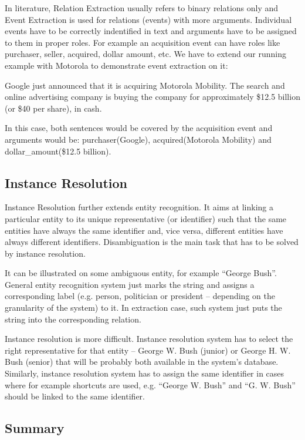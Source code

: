In literature, Relation Extraction usually refers to binary relations only and Event Extraction is used for relations (events) with more arguments. Individual events have to be correctly indentified in text and arguments have to be assigned to them in proper roles. For example an acquisition event can have roles like purchaser, seller, acquired, dollar amount, etc. We have to extend our running example with Motorola to demonstrate event extraction on it:

Google just announced that it is acquiring Motorola Mobility. The search and online advertising company is buying the company for approximately \$12.5 billion (or \$40 per share), in cash.

In this case, both sentences would be covered by the acquisition event and arguments would be: purchaser(Google), acquired(Motorola Mobility) and dollar\_amount(\$12.5 billion).

\subsection{Instance Resolution}

Instance Resolution further extends entity recognition. It aims at linking a particular entity to its unique representative (or identifier) such that the same entities have always the same identifier and, vice versa, different entities have always different identifiers. Disambiguation is the main task that has to be solved by instance resolution.

It can be illustrated on some ambiguous entity, for example “George Bush”. General entity recognition system just marks the string and assigns a corresponding label (e.g. person, politician or president -- depending on the granularity of the system) to it. In extraction case, such system just puts the string into the corresponding relation. 

Instance resolution is more difficult. Instance resolution system has to select the right representative for that entity -- George W. Bush (junior) or George H. W. Bush (senior) that will be probably both available in the system’s database. Similarly, instance resolution system has to assign the same identifier in cases where for example shortcuts are used, e.g. “George W. Bush” and “G. W. Bush” should be linked to the same identifier.

\subsection{Summary}


